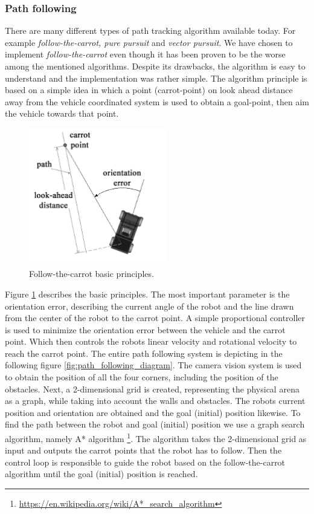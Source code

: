 \subsubsection{Path following}

There are many different types of path tracking algorithm available today. For example \emph{follow-the-carrot, pure pursuit} and \emph{vector pursuit}. We have chosen to implement \emph{follow-the-carrot} even though it has been proven \cite{lundgren2003path} to be the worse among the mentioned algorithms. Despite its drawbacks, the algorithm is easy to understand and the implementation was rather simple. The algorithm principle is based on a simple idea in which a point (carrot-point) on look ahead distance away from the vehicle coordinated system is used to obtain a goal-point, then aim the vehicle towards that point.

\begin{figure}[H]
  \centering	
  \includegraphics[width=6cm]{include/images/follow_the_carrot.PNG}
  \caption{Follow-the-carrot basic principles.}
  \label{fig:follow_the_carrot}
\end{figure}

Figure \ref{fig:follow_the_carrot} describes the basic principles. The most important parameter is the orientation error, describing the current angle of the robot and the line drawn from the center of the robot to the carrot point. A simple proportional controller is used to minimize the orientation error between the vehicle and the carrot point. Which then controls the robots linear velocity and rotational velocity to reach the carrot point. The entire path following system is depicting in the following figure \ref{fig:path_following_diagram}. The camera vision system is used to obtain the position of all the four corners, including the position of the obstacles. Next, a 2-dimensional grid is created, representing the physical arena as a graph, while taking into account the walls and obstacles. The robots current position and orientation are obtained and the goal (initial) position likewise. To find the path between the robot and goal (initial) position we use a graph search algorithm, namely A* algorithm \footnote{\url{https://en.wikipedia.org/wiki/A*_search_algorithm}}. The algorithm takes the 2-dimensional grid as input and outputs the carrot points that the robot has to follow. Then the control loop is responsible to guide the robot based on the follow-the-carrot algorithm until the goal (initial) position is reached.

